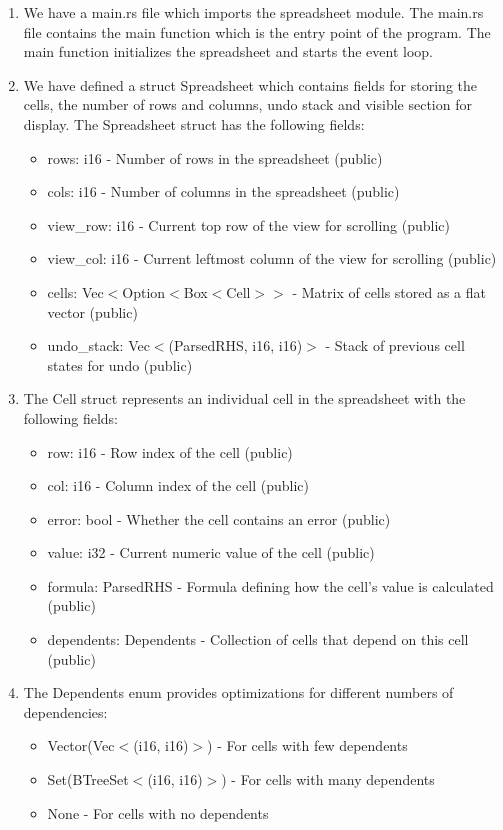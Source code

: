 \documentclass[10pt,a4paper]{article}  %
\begin{document}
\begin{enumerate}
\item We have a main.rs file which imports the spreadsheet module. The main.rs file contains the main function which is the entry point of the program. The main function initializes the spreadsheet and starts the event loop.

\item We have defined a struct Spreadsheet which contains fields for storing the cells, the number of rows and columns, undo stack and visible section for display. The Spreadsheet struct has the following fields:
\begin{itemize}
    \item rows: i16 - Number of rows in the spreadsheet (public)
    \item cols: i16 - Number of columns in the spreadsheet (public)
    \item view\_row: i16 - Current top row of the view for scrolling (public)
    \item view\_col: i16 - Current leftmost column of the view for scrolling (public)
    \item cells: Vec$<$Option$<$Box$<$Cell$>$$>$ - Matrix of cells stored as a flat vector (public)
    \item undo\_stack: Vec$<$(ParsedRHS, i16, i16)$>$ - Stack of previous cell states for undo (public)
\end{itemize}

\item The Cell struct represents an individual cell in the spreadsheet with the following fields:
\begin{itemize}
    \item row: i16 - Row index of the cell (public)
    \item col: i16 - Column index of the cell (public)
    \item error: bool - Whether the cell contains an error (public)
    \item value: i32 - Current numeric value of the cell (public)
    \item formula: ParsedRHS - Formula defining how the cell's value is calculated (public)
    \item dependents: Dependents - Collection of cells that depend on this cell (public)
\end{itemize}

\item The Dependents enum provides optimizations for different numbers of dependencies:
\begin{itemize}
    \item Vector(Vec$<$(i16, i16)$>$) - For cells with few dependents
    \item Set(BTreeSet$<$(i16, i16)$>$) - For cells with many dependents
    \item None - For cells with no dependents
\end{itemize}


\end{enumerate}
\end{document}
